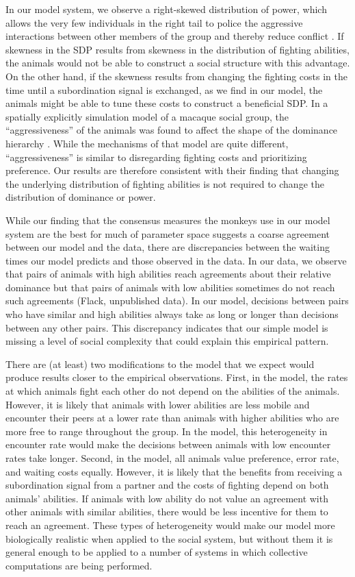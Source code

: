 \documentclass{pnastwo}
\begin{document}
\begin{article}
In our model system, we observe a right-skewed distribution of power, which allows the very few individuals in the right tail to police the aggressive interactions between other members of the group and thereby reduce conflict \cite{Brush:2013fk,Flack:2006uq,Flack:2006fk}. If skewness in the SDP results from skewness in the distribution of fighting abilities, the animals would not be able to construct a social structure with this advantage. On the other hand, if the skewness results from changing the fighting costs in the time until a subordination signal is exchanged, as we find in our model, the animals might be able to tune these costs to construct a beneficial SDP. In a spatially explicitly simulation model of a macaque social group, the ``aggressiveness'' of the animals was found to affect the shape of the dominance hierarchy \cite{Hemelrijk:2011fk}.  While the mechanisms of that model are quite different, ``aggressiveness'' is similar to disregarding fighting costs and prioritizing preference. Our results are therefore consistent with their finding that changing the underlying distribution of fighting abilities is not required to change the distribution of dominance or power.

While our finding that the consensus measures the monkeys use in our model system are the best for much of parameter space suggests a coarse agreement between our model and the data, there are discrepancies between the waiting times our model predicts and those observed in the data.  In our data, we observe that pairs of animals with high abilities reach agreements about their relative dominance but that pairs of animals with low abilities sometimes do not reach such agreements (Flack, unpublished data).  In our model, decisions between pairs who have similar and high abilities always  take as long or longer than decisions between any other pairs.  This discrepancy indicates that our simple model is missing a level of social complexity that could explain this empirical pattern.  

There are (at least) two modifications to the model that we expect would produce results closer to the empirical observations.  First, in the model, the rates at which animals fight each other do not depend on the abilities of the animals.  However, it is likely that animals with lower abilities are less mobile and encounter their peers at a lower rate than animals with higher abilities who are more free to range throughout the group.  In the model, this heterogeneity in encounter rate would make the decisions between animals with low encounter rates take longer.  Second, in the model, all animals value preference, error rate, and waiting costs equally.  However, it is likely that the benefits from receiving a subordination signal from a partner and the costs of fighting depend on both animals' abilities.  If animals with low ability  do not value an agreement with other animals with similar abilities, there would be less incentive for them to reach an agreement.  These types of heterogeneity would make our model more biologically realistic when applied to the social system, but without them it is general enough to be applied to a number of systems in which collective computations are being performed.  


\end{article}
\end{document}
